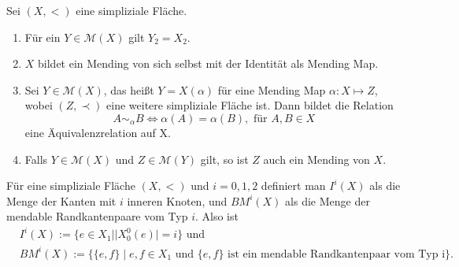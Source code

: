 \documentclass[12pt,titlepage]{article}
\begin{document}
  \begin{bemerkung}
  Sei $(X,<)$ eine simpliziale Fläche.
  \begin{enumerate}
  \item Für ein $Y \in \mathcal{M}(X)$ gilt $Y_2=X_2$.
  \item $X$ bildet ein Mending von sich selbst mit der Identität als Mending Map.
  \item Sei $Y\in \mathcal{M}(X)$, das heißt $Y=X(\alpha)$ für eine Mending Map $\alpha:X \mapsto Z$, wobei $(Z,\prec)$ eine weitere simpliziale Fläche ist. Dann bildet die Relation 
  \[
A\sim_\alpha B \Leftrightarrow \alpha(A)=\alpha(B),\text{ für }A,B \in X
  \]
  eine Äquivalenzrelation auf X.
  \item Falls $Y\in \mathcal{M}(X)$ und $Z \in \mathcal{M}(Y)$ gilt, so ist $Z$ auch ein Mending von $X$.
  \end{enumerate}
  \end{bemerkung}
  
  \begin{definition}
  Für eine simpliziale Fläche $(X,<)$ und $i=0,1,2$ definiert man $I^{i}(X)$ als die Menge der Kanten mit $i$ inneren Knoten, und $BM^{i}(X)$ als die Menge der mendable Randkantenpaare vom Typ $i$. Also ist
  \begin{align*}
  &I^i(X):=\{e \in X_1 \mid \vert X_{0}^{0}(e)\vert=i\}\text{ und}\\
  &BM^{i}(X):=\{\{e,f\} \mid e,f \in X_1 \text{ und }\{e,f\}\text{ ist ein mendable Randkantenpaar vom Typ i}\}.\\
  \end{align*}
  \end{definition}
  
  
  \newpage
\end{document}
